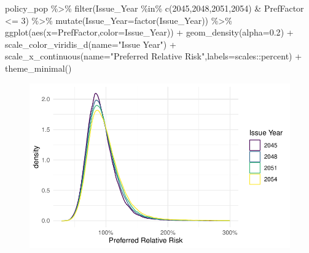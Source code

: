 \documentclass[
  letterpaper,
  DIV=11,
  numbers=noendperiod]{scrartcl}
\newenvironment{Shaded}{\begin{snugshade}}{\end{snugshade}}
\newcommand{\AttributeTok}[1]{\textcolor[rgb]{0.40,0.45,0.13}{#1}}
\newcommand{\DecValTok}[1]{\textcolor[rgb]{0.68,0.00,0.00}{#1}}
\newcommand{\FloatTok}[1]{\textcolor[rgb]{0.68,0.00,0.00}{#1}}
\newcommand{\FunctionTok}[1]{\textcolor[rgb]{0.28,0.35,0.67}{#1}}
\newcommand{\NormalTok}[1]{\textcolor[rgb]{0.00,0.23,0.31}{#1}}
\newcommand{\SpecialCharTok}[1]{\textcolor[rgb]{0.37,0.37,0.37}{#1}}
\newcommand{\StringTok}[1]{\textcolor[rgb]{0.13,0.47,0.30}{#1}}
\begin{document}
\begin{Shaded}
\begin{Highlighting}[]
\NormalTok{policy\_pop }\SpecialCharTok{\%\textgreater{}\%}
  \FunctionTok{filter}\NormalTok{(Issue\_Year }\SpecialCharTok{\%in\%} \FunctionTok{c}\NormalTok{(}\DecValTok{2045}\NormalTok{,}\DecValTok{2048}\NormalTok{,}\DecValTok{2051}\NormalTok{,}\DecValTok{2054}\NormalTok{) }\SpecialCharTok{\&}\NormalTok{ PrefFactor }\SpecialCharTok{\textless{}=} \DecValTok{3}\NormalTok{) }\SpecialCharTok{\%\textgreater{}\%}
  \FunctionTok{mutate}\NormalTok{(}\AttributeTok{Issue\_Year=}\FunctionTok{factor}\NormalTok{(Issue\_Year)) }\SpecialCharTok{\%\textgreater{}\%}
  \FunctionTok{ggplot}\NormalTok{(}\FunctionTok{aes}\NormalTok{(}\AttributeTok{x=}\NormalTok{PrefFactor,}\AttributeTok{color=}\NormalTok{Issue\_Year)) }\SpecialCharTok{+}
  \FunctionTok{geom\_density}\NormalTok{(}\AttributeTok{alpha=}\FloatTok{0.2}\NormalTok{) }\SpecialCharTok{+}
  \FunctionTok{scale\_color\_viridis\_d}\NormalTok{(}\AttributeTok{name=}\StringTok{"Issue Year"}\NormalTok{) }\SpecialCharTok{+} 
  \FunctionTok{scale\_x\_continuous}\NormalTok{(}\AttributeTok{name=}\StringTok{"Preferred Relative Risk"}\NormalTok{,}\AttributeTok{labels=}\NormalTok{scales}\SpecialCharTok{::}\NormalTok{percent) }\SpecialCharTok{+}
  \FunctionTok{theme\_minimal}\NormalTok{()}
\end{Highlighting}
\end{Shaded}

\begin{figure}[H]

{\centering \includegraphics{MakingData_files/figure-pdf/unnamed-chunk-11-1.pdf}

}

\end{figure}
\end{document}
